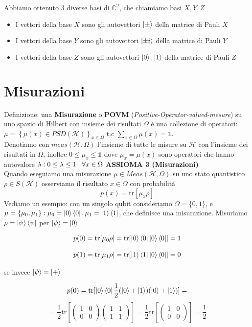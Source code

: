 \documentclass{report}
\begin{document}
Abbiamo ottenuto 3 diverse basi di $\mathbb{C^2}$, che chiamiamo basi $X,Y,Z$
\begin{itemize}
    \item I vettori della base $X$ sono gli autovettori $\ket{\pm}$ della matrice di Pauli $X$
    \item I vettori della base $Y$ sono gli autovettori $\ket{\pm i}$ della matrice di Pauli $Y$
    \item I vettori della base $Z$ sono gli autovettori $\ket{0},\ket{1}$ della matrice di Pauli $Z$
\end{itemize}

\section{Misurazioni}
Definizione: una \textbf{Misurazione} o \textbf{POVM} (\textit{Positive-Operator-valued-mesure}) su uno spazio di Hilbert con insieme dei risultati $\Omega$ è una collezione di operatori: $\mu=\left\{ \mu(x) \in \textit{PSD}(\mathcal{H}) \right\}_{x\in\Omega}$ t.c $\sum_{x\in\Omega} \mu(x) = \mathbb{1}$.
\medskip
\\Denotiamo con $\textit{meas}(\mathcal{H},\Omega)$ l'insieme di tutte le misure su $\mathcal{H}$ con l'insieme dei risultati in $\Omega$, inoltre $0\le\mu_x\le\mathbb{1}$ dove $\mu_x=\mu(x)$ sono operatori che hanno autovalore $\lambda:0\le\lambda\le1 \hspace{0.3cm} \forall x \in \Omega$
\newpage
\textbf{ASSIOMA 3 (Misurazioni)}
\\Quando eseguiamo una misurazione $\mu\in \textit{Meas}(\mathcal{H},\Omega)$ su uno stato quantistico $\rho\in S(\mathcal{H})$ osserviamo il risultato $x\in \Omega$ con probabilità $$p(x) = \text{tr}[\mu_x\rho]$$
Vediamo un esempio: con un singolo qubit consideriamo $\Omega= \{0,1\}$, e \\$\mu=\{\mu_0,\mu_1\}:\mu_0=\ket{0}\bra{0},\mu_1=\ket{1}\bra{1}$, che definisce una misurazione. Misuriamo $\rho = \ket{\psi}\bra{\psi}$ per $\ket{\psi} = \ket{0}$

$$
    p(0)=\text{tr}[\mu_0\rho]=\text{tr}[\ket{0}\bra{0}\ket{0}\bra{0}] = 1
$$

$$
    p(1)=\text{tr}[\mu_1\rho]=\text{tr}[\ket{1}\bra{1}\ket{0}\bra{0}] = 0
$$

se invece $\ket{\psi} = \ket{+}$

$$
    p(0) = \text{tr}[\ket{0}\bra{0}\frac{1}{2}(\ket{0}+\ket{1})(\ket{0}+\ket{1})] = 
$$
$$
    = \frac{1}{2} \text{tr}\left[
    \begin{pmatrix}
        1 & 0\\
        0 & 0
    \end{pmatrix}
    \begin{pmatrix}
        1 & 1\\
        1 & 1
    \end{pmatrix}
    \right]
     = 
     \frac{1}{2} \text{tr}\left[
    \begin{pmatrix}
        1 & 0\\
        0 & 0
    \end{pmatrix}\right] = \frac{1}{2}
$$
\end{document}

